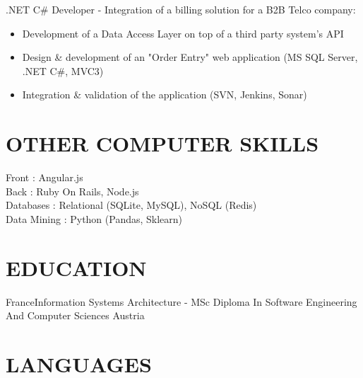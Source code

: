 \documentclass[11pt,a4paper]{moderncv}
\begin{document}
{}{.NET C\# Developer - Integration of a billing solution for a B2B Telco company: 
\begin{itemize}
\item Development of a Data Access Layer on top of a third party system's API
\item Design \& development of an "Order Entry" web application (MS SQL Server,  .NET C\#, MVC3)
\item Integration \& validation of the application (SVN, Jenkins, Sonar)
\end{itemize} }{}{}



\section{OTHER COMPUTER SKILLS}

{Front : Angular.js
\\ Back : Ruby On Rails, Node.js
\\Databases : Relational (SQLite, MySQL), NoSQL (Redis)
\\Data Mining : Python (Pandas, Sklearn)}{}{}{}

\section{EDUCATION}

{France}{}{Information Systems Architecture - MSc Diploma In Software Engineering And Computer Sciences}{}{}
{Austria}{}{}{}{}



\section{LANGUAGES}
\end{document}
